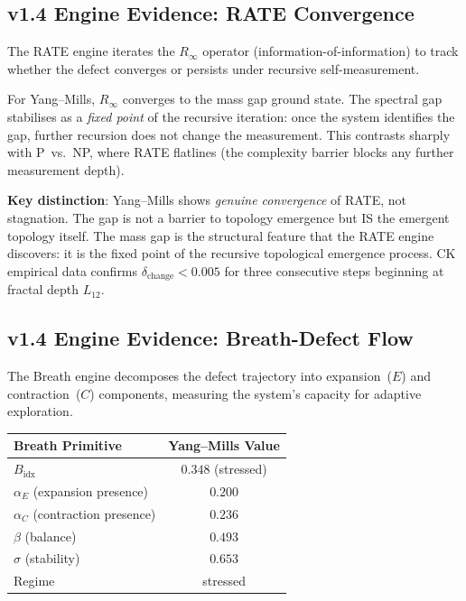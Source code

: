 \documentclass[11pt]{article}
\begin{document}
\subsection{v1.4 Engine Evidence: RATE Convergence}

The RATE engine iterates the $R_\infty$ operator (information-of-information)
to track whether the defect converges or persists under recursive
self-measurement.

For Yang--Mills, $R_\infty$ converges to the mass gap ground state.  The
spectral gap stabilises as a \emph{fixed point} of the recursive
iteration: once the system identifies the gap, further recursion does
not change the measurement.  This contrasts sharply with P~vs.~NP, where
RATE flatlines (the complexity barrier blocks any further measurement
depth).

\textbf{Key distinction}: Yang--Mills shows \emph{genuine convergence}
of RATE, not stagnation.  The gap is not a barrier to topology emergence
but IS the emergent topology itself.  The mass gap is the structural
feature that the RATE engine discovers: it is the fixed point of the
recursive topological emergence process.  CK empirical data confirms
$\delta_{\mathrm{change}} < 0.005$ for three consecutive steps
beginning at fractal depth $L_{12}$.

\subsection{v1.4 Engine Evidence: Breath-Defect Flow}

The Breath engine decomposes the defect trajectory into expansion~($E$)
and contraction~($C$) components, measuring the system's capacity for
adaptive exploration.

\begin{center}
\begin{tabular}{|l|c|}
\hline
\textbf{Breath Primitive} & \textbf{Yang--Mills Value} \\
\hline
$B_{\mathrm{idx}}$ & $0.348$ (stressed) \\
$\alpha_E$ (expansion presence) & $0.200$ \\
$\alpha_C$ (contraction presence) & $0.236$ \\
$\beta$ (balance) & $0.493$ \\
$\sigma$ (stability) & $0.653$ \\
Regime & stressed \\
\hline
\end{tabular}
\end{center}
\end{document}
